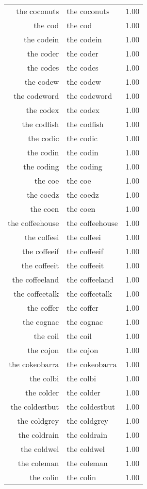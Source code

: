 \begin{table}[ht]
\begin{tabular}{rlr}
  the coconuts & the coconuts & 1.00 \\ 
  the cod & the cod & 1.00 \\ 
  the codein & the codein & 1.00 \\ 
  the coder & the coder & 1.00 \\ 
  the codes & the codes & 1.00 \\ 
  the codew & the codew & 1.00 \\ 
  the codeword & the codeword & 1.00 \\ 
  the codex & the codex & 1.00 \\ 
  the codfish & the codfish & 1.00 \\ 
  the codic & the codic & 1.00 \\ 
  the codin & the codin & 1.00 \\ 
  the coding & the coding & 1.00 \\ 
  the coe & the coe & 1.00 \\ 
  the coedz & the coedz & 1.00 \\ 
  the coen & the coen & 1.00 \\ 
  the coffeehouse & the coffeehouse & 1.00 \\ 
  the coffeei & the coffeei & 1.00 \\ 
  the coffeeif & the coffeeif & 1.00 \\ 
  the coffeeit & the coffeeit & 1.00 \\ 
  the coffeeland & the coffeeland & 1.00 \\ 
  the coffeetalk & the coffeetalk & 1.00 \\ 
  the coffer & the coffer & 1.00 \\ 
  the cognac & the cognac & 1.00 \\ 
  the coil & the coil & 1.00 \\ 
  the cojon & the cojon & 1.00 \\ 
  the cokeobarra & the cokeobarra & 1.00 \\ 
  the colbi & the colbi & 1.00 \\ 
  the colder & the colder & 1.00 \\ 
  the coldestbut & the coldestbut & 1.00 \\ 
  the coldgrey & the coldgrey & 1.00 \\ 
  the coldrain & the coldrain & 1.00 \\ 
  the coldwel & the coldwel & 1.00 \\ 
  the coleman & the coleman & 1.00 \\ 
  the colin & the colin & 1.00 \\ 

\end{tabular}
\end{table}
